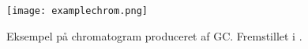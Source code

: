 \begin{figure}[htbp]
	\centering
	\texttt{[image: examplechrom.png]}
	\caption{Eksempel på chromatogram produceret af GC. Fremstillet i .}
	\label{fig:examplechrom}
\end{figure}
